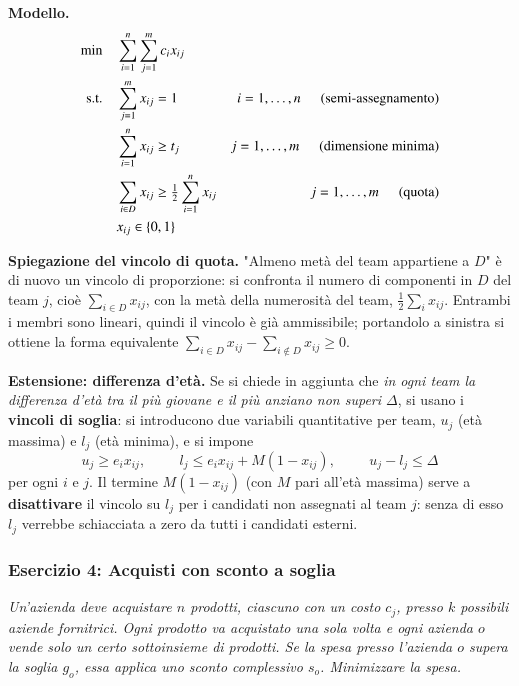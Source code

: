 \documentclass[12pt]{extarticle} %
\begin{document}
\noindent\textbf{Modello.}
\[
\begin{aligned}
\min \quad & \sum_{i=1}^n \sum_{j=1}^m c_i x_{ij} \\
\text{s.t.} \quad & \sum_{j=1}^m x_{ij} = 1 & i=1,\dots,n \hspace{0.5cm}\text{(semi-assegnamento)}\\
& \sum_{i=1}^n x_{ij} \ge t_j & j=1,\dots,m \hspace{0.5cm}\text{(dimensione minima)}\\
& \sum_{i \in D} x_{ij} \ge \tfrac{1}{2}\sum_{i=1}^n x_{ij} & j=1,\dots,m \hspace{0.5cm}\text{(quota)}\\
& x_{ij} \in \{0,1\}
\end{aligned}
\]

\noindent\textbf{Spiegazione del vincolo di quota.} "Almeno metà del team appartiene a $D$" è di nuovo un vincolo di proporzione: si confronta il numero di componenti in $D$ del team $j$, cioè $\sum_{i\in D}x_{ij}$, con la metà della numerosità del team, $\frac{1}{2}\sum_{i}x_{ij}$. Entrambi i membri sono lineari, quindi il vincolo è già ammissibile; portandolo a sinistra si ottiene la forma equivalente $\sum_{i\in D} x_{ij} - \sum_{i \notin D} x_{ij} \ge 0$.

\noindent\textbf{Estensione: differenza d'età.} Se si chiede in aggiunta che \textit{in ogni team la differenza d'età tra il più giovane e il più anziano non superi $\Delta$}, si usano i \textbf{vincoli di soglia}: si introducono due variabili quantitative per team, $u_j$ (età massima) e $l_j$ (età minima), e si impone
\[
u_j \ge e_i x_{ij}, \hspace{1cm} l_j \le e_i x_{ij} + M(1-x_{ij}), \hspace{1cm} u_j - l_j \le \Delta
\]
per ogni $i$ e $j$. Il termine $M(1-x_{ij})$ (con $M$ pari all'età massima) serve a \textbf{disattivare} il vincolo su $l_j$ per i candidati non assegnati al team $j$: senza di esso $l_j$ verrebbe schiacciata a zero da tutti i candidati esterni.

\subsubsection{Esercizio 4: Acquisti con sconto a soglia}
\textit{Un'azienda deve acquistare $n$ prodotti, ciascuno con un costo $c_j$, presso $k$ possibili aziende fornitrici. Ogni prodotto va acquistato una sola volta e ogni azienda $o$ vende solo un certo sottoinsieme di prodotti. Se la spesa presso l'azienda $o$ supera la soglia $g_o$, essa applica uno sconto complessivo $s_o$. Minimizzare la spesa.}\\
\end{document}
